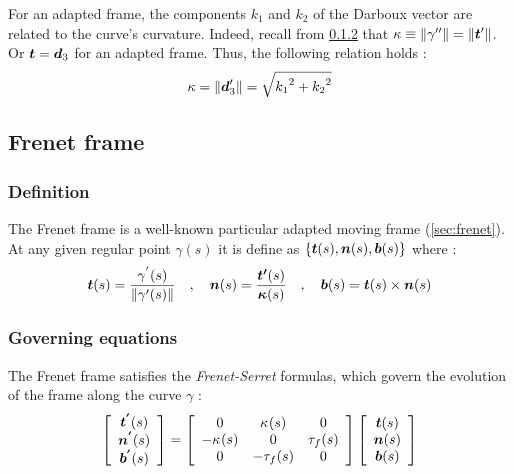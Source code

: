 For an adapted frame, the components $k_1$ and $k_2$ of the Darboux vector are related to the curve's curvature. Indeed, recall from \ref{} that $\kappa \equiv \|\gamma''\| = \|\boldsymbol{t}'\|$. Or $\boldsymbol{t} = \boldsymbol{d}_3$ for an adapted frame. Thus, the following relation holds :
\begin{equation}
	\kappa = \|\boldsymbol{d}'_3\| = \sqrt{{k_{1}}^2 + {k_{2}}^2}
\end{equation}

\subsection{Frenet frame}

\subsubsection{Definition}
The Frenet frame is a well-known particular adapted moving frame (\autoref{sec:frenet}). At any given regular point $\gamma(s)$ it is define as $\{\boldsymbol{t}(s),\boldsymbol{n}(s),\boldsymbol{b}(s)\}$ where :
\begin{gather}
\boldsymbol{t}(s) = \frac{\gamma^{'}(s)}{\|\gamma'(s)\|}
\quad,\quad
\boldsymbol{n}(s) = \frac{\boldsymbol{t'}(s)}{\boldsymbol{\kappa}(s)}
\quad,\quad
\boldsymbol{b}(s)= \boldsymbol{t}(s)\times\boldsymbol{n}(s)
\end{gather}

\subsubsection{Governing equations}
The Frenet frame satisfies the \emph{Frenet-Serret} formulas, which govern the evolution of the frame along the curve $\gamma$ :
\begin{gather}
\left[\begin{array}{c}
\boldsymbol{t^{'}}(s) \\
\boldsymbol{n^{'}}(s) \\
\boldsymbol{b^{'}}(s)
\end{array}\right]
=
\left[\begin{array}{ccc}
0 & \kappa_{}(s) & 0 \\
-\kappa_{}(s) & 0 & \tau_f(s) \\
0 & -\tau_f(s) & 0
\end{array}\right]
\left[\begin{array}{c}
\boldsymbol{t}(s) \\
\boldsymbol{n}(s) \\
\boldsymbol{b}(s)
\end{array}\right]
\end{gather}

